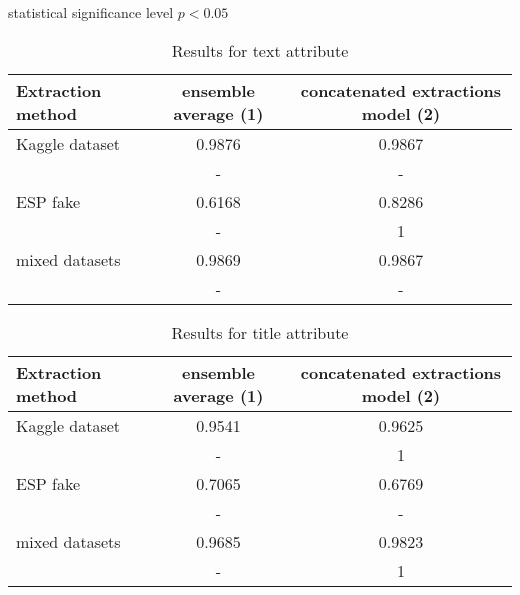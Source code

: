 \documentclass{article}
\begin{document}
statistical significance level $ p < 0.05 $

\begin{table}[]
  \centering
  \caption{Results for text attribute}

  \begin{tabular}{|l|c|c|}
  \hline
  Extraction method & ensemble average (1) & concatenated extractions model (2)\\
  \hline
  Kaggle dataset     & 0.9876         & 0.9867  \\
                & \small{-}     & \small{-}    \\
  \hline
  ESP fake      &  0.6168        & 0.8286        \\
                & \small{-}     & \small{1}    \\
  \hline
  mixed datasets & 0.9869         & 0.9867       \\
                & \small{-}   & \small{-}      \\
  \hline

\end{tabular}
  \label{tab:results_text}
\end{table}

\begin{table}[]
  \centering
  \caption{Results for title attribute}

  \begin{tabular}{|l|c|c|}
  \hline
  Extraction method & ensemble average (1) & concatenated extractions model (2)\\
  \hline
  Kaggle dataset     & 0.9541         & 0.9625  \\
                & \small{-}     & \small{1}    \\
  \hline
  ESP fake      &  0.7065        & 0.6769        \\
                & \small{-}     & \small{-}    \\
  \hline
  mixed datasets & 0.9685         & 0.9823       \\
                & \small{-}   & \small{1}      \\
  \hline

\end{tabular}
  \label{tab:results_title}
\end{table}
\end{document}
